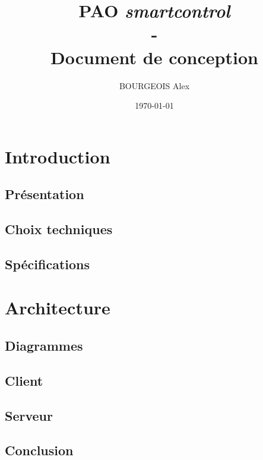 \documentclass[a4paper,12pt]{report}
\title{\textbf{PAO \textit{smartcontrol}}\\-\\Document de conception}
\author{BOURGEOIS Alex}
\date \today
\begin{document}
\maketitle

\chapter{Introduction}

\section{Présentation}

\section{Choix techniques}

\section{Spécifications}

\newpage

\chapter{Architecture}

\section{Diagrammes}

\newpage
\section{Client}

\newpage
\section{Serveur}


\section{Conclusion}

\end{document}
